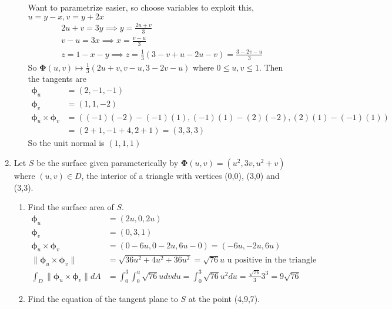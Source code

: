 \documentclass{article}
\newcommand{\norm}[1]{\| #1 \|}
\begin{document}
\begin{enumerate}
\begin{enumerate}
        Want to parametrize easier, so choose variables to exploit this, $u = y - x, v = y + 2x$
        \begin{align*}
            2u + v = 3y \implies y = \frac{2u + v}{3} \\
            v - u = 3x \implies x = \frac{v - u}{3} \\
            z = 1 - x - y \implies z = \frac{1}{3}(3 -v + u -2u -v) = \frac{3 -2v -u}{3}
        \end{align*}
        So $\boldsymbol \Phi(u,v) \mapsto \frac{1}{3}(2u + v, v - u, 3 - 2v -u)$ where $0 \leq u , v \leq 1$.
        Then the tangents are
        \begin{align*}
            \boldsymbol \phi_u &= (2, -1, -1) \\
            \boldsymbol \phi_v &= (1,1,-2) \\
            \boldsymbol \phi_u \times \boldsymbol \phi_v &= ((-1)(-2) - (-1)(1), (-1)(1) - (2)(-2), (2)(1) - (-1)(1)) \\
            &= (2 + 1, -1 + 4, 2 + 1) = (3,3,3)
        \end{align*}
        So the unit normal is $(1,1,1)$
    \end{enumerate}
    \newpage
    \item Let $S$ be the surface given parameterically by $\boldsymbol \Phi (u,v) = (u^2, 3v, u^2 + v)$ where $(u,v) \in D$, the interior of a triangle with vertices (0,0), (3,0) and (3,3).
    \begin{enumerate}
        \item Find the surface area of $S$.
        \begin{align*}
            \boldsymbol \phi_u &= (2u, 0, 2u) \\
            \boldsymbol \phi_v &= (0, 3, 1) \\
            \boldsymbol \phi_u \times \boldsymbol \phi_v &= (0 - 6u, 0 - 2u, 6u - 0) = (-6u, -2u, 6u) \\
            \norm{\boldsymbol \phi_u \times \boldsymbol \phi_v} &= \sqrt{36u^2 + 4u^2 + 36u^2} = \sqrt{76}u \text{ u positive in the triangle}\\
            \int_D \norm{\boldsymbol \phi_u \times \boldsymbol \phi_v} dA &= \int_0^3\int_0^u \sqrt{76}u dv du = \int_0^3 \sqrt{76}{u^2} du = \frac{\sqrt{76}}{3}3^3 = 9\sqrt{76}        
        \end{align*}
        \item Find the equation of the tangent plane to $S$ at the point (4,9,7).
    \end{enumerate}

\end{enumerate}
\end{document}
